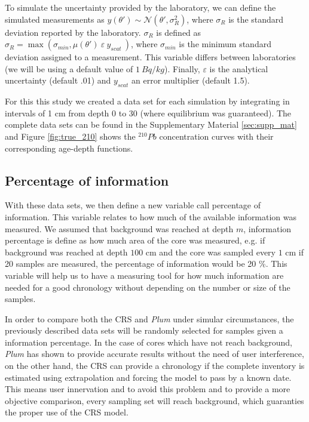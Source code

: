 \documentclass [10pt] {article}
\begin{document}
	To simulate the uncertainty provided by the laboratory, we can define the simulated measurements as  $y(\theta')\sim\mathcal{N}\left(\theta',\sigma_R^2\right)$, where $\sigma_R$ is the standard deviation reported by the laboratory. 
$\sigma_R$ is defined as $\sigma_R= \max \left(\sigma_{min}, \mu(\theta')~\varepsilon~y_{scat}~\right)$, where $\sigma_{min}$ is the minimum standard deviation assigned to a measurement. This variable differs between laboratories (we will be using a default value of $1~ Bq/kg$). 
Finally, $\varepsilon$ is the analytical uncertainty (default .01) and $y_{scat}$ an error multiplier (default 1.5).

	For this this study we created a data set for each simulation by integrating in intervals of 1 cm from depth 0 to 30 (where equilibrium was guaranteed).
The complete data sets can be found in the Supplementary Material \ref{sec:supp_mat} and Figure \ref{fig:true_210} shows the $^{210}Pb$ concentration curves with their corresponding age-depth functions. 

\subsection{Percentage of information}

	With these data sets, we then define a new variable call percentage of information. 
This variable relates to how much of the available information was measured. 
We assumed that background was reached at depth $m$, information percentage is define as how much area of the core was measured, e.g. if background was reached at depth $100$ cm and the core was sampled every $1$ cm if 20 samples are measured, the percentage of information would be 20 \%. 
This variable will help us to have a measuring tool for how much information are needed for a good chronology without depending on the number or size of the samples. 

In order to compare both the CRS and \textit{Plum} under simular circumstances, the previously described data sets will be randomly selected for samples given a information percentage. 
In the case of cores which have not reach background, \textit{Plum} \citep{Aquino2018} has shown to provide accurate results without the need of user interference, on the other hand, the CRS can provide a chronology if the complete inventory is estimated using extrapolation and forcing the model to pass by a known date.
This means user innervation and to avoid this problem and to provide a more objective comparison, every sampling set will reach background, which guaranties the proper use of the CRS model. 
\end{document}
